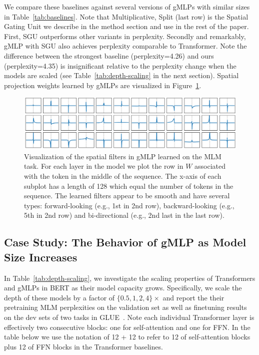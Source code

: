 \documentclass{article}
\newcommand{\gffn}{gMLP\xspace}
\begin{document}
We compare these baselines against several versions of \gffn{s} with similar sizes in Table~\ref{tab:baselines}. Note that Multiplicative, Split (last row) is the Spatial Gating Unit we describe in the method section and use in the rest of the paper. First, SGU outperforms other variants in perplexity. Secondly and remarkably, \gffn with SGU also achieves perplexity comparable to Transformer.
Note the difference between the strongest baseline (perplexity=4.26) and ours (perplexity=4.35) is insignificant relative to the perplexity change when the models are scaled (see Table~\ref{tab:depth-scaling} in the next section).
Spatial projection weights
learned by \gffn{s} are visualized in Figure~\ref{fig:mlm-filters}.

\begin{figure}[h]
    \centering
    \includegraphics[width=0.7\linewidth]{figures/mlm-filters.png}
    \caption{Visualization of the spatial filters in \gffn learned on the MLM task. For each layer in the model we plot the row in $W$ associated with the token in the middle of the sequence. The x-axis of each subplot has a length of 128 which equal the number of tokens in the sequence.
    The learned filters appear to be smooth and have several types: forward-looking (e.g., 1st in 2nd row), backward-looking (e.g., 5th in 2nd row) and bi-directional (e.g., 2nd last in the last row).}
    \label{fig:mlm-filters}
    \vspace{-0.2cm}
\end{figure}

\subsection{Case Study: The Behavior of \gffn as Model Size Increases}
\label{sec:scaling}

In Table~\ref{tab:depth-scaling},
we investigate the scaling properties of Transformers and \gffn{s} in BERT as their model capacity grows.
Specifically,
we scale the depth of these models by a factor of $\{0.5, 1, 2, 4\}\times$ and report the their pretraining MLM perplexities on the validation set as well as finetuning results on the dev sets of two tasks in GLUE~\cite{wang2018glue}.
Note each individual Transformer layer is effectively two consecutive blocks: one for self-attention and one for FFN. In the table below we use the notation of 12 + 12 to refer to 12 of self-attention blocks plus 12 of FFN blocks in the Transformer baselines.
\end{document}
